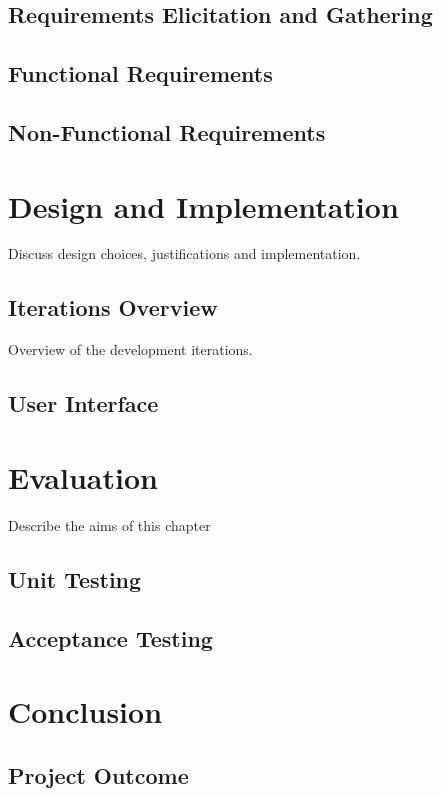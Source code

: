 \documentclass{4thYearProject}
\begin{document}
\section{Requirements Elicitation and Gathering}


\section{Functional Requirements}

\newpage
\section{Non-Functional Requirements}

\chapter{Design and Implementation}

Discuss design choices, justifications and implementation.

\section{Iterations Overview}

Overview of the development iterations.

\section{User Interface}

\chapter{Evaluation}

Describe the aims of this chapter

\section{Unit Testing}
\section{Acceptance Testing}


\chapter{Conclusion}

\section{Project Outcome}
\end{document}
